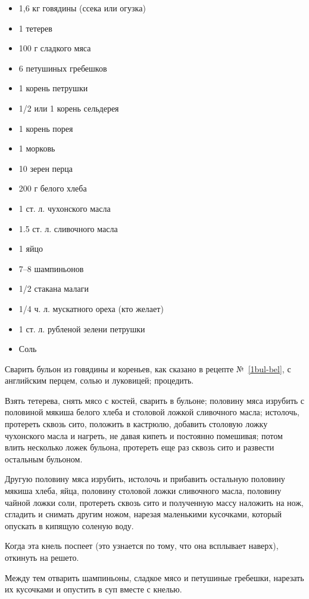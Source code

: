 \begin{itemize}
	\item 1,6 кг говядины (ссека или огузка)
    \item 1 тетерев 
    \item 100 г сладкого мяса
    \item 6 петушиных гребешков
    \item 1 корень петрушки 
    \item 1/2 или 1 корень сельдерея
    \item 1 корень порея 
    \item 1 морковь 
    \item 10 зерен перца 
    \item 200 г белого хлеба 
    \item 1 ст. л. чухонского масла
    \item 1.5 ст. л. сливочного масла
    \item 1 яйцо 
    \item 7–8 шампиньонов 
    \item 1/2 стакана малаги
    \item 1/4 ч. л. мускатного ореха (кто желает) 
    \item 1 ст. л. рубленой зелени петрушки 
    \item Соль
\end{itemize}

Сварить бульон из говядины и кореньев, как сказано в рецепте №~\ref{1bul-bel}, с английским перцем, солью и луковицей; процедить.

Взять тетерева, снять мясо с костей, сварить в бульоне; половину мяса изрубить с половиной мякиша белого хлеба и столовой ложкой сливочного масла; истолочь, протереть сквозь сито, положить в кастрюлю, добавить столовую ложку чухонского масла и нагреть, не давая кипеть и постоянно помешивая; потом влить несколько ложек бульона, протереть еще раз сквозь сито и развести остальным бульоном.

Другую половину мяса изрубить, истолочь и прибавить остальную половину мякиша хлеба, яйца, половину столовой ложки сливочного масла, половину чайной ложки соли, протереть сквозь сито и полученную массу наложить на нож, сгладить и снимать другим ножом, нарезая маленькими кусочками, который опускать в кипящую соленую воду.

Когда эта кнель поспеет (это узнается по тому, что она всплывает наверх), откинуть на решето.

Между тем отварить шампиньоны, сладкое мясо и петушиные гребешки, нарезать их кусочками и опустить в суп вместе с кнелью.

